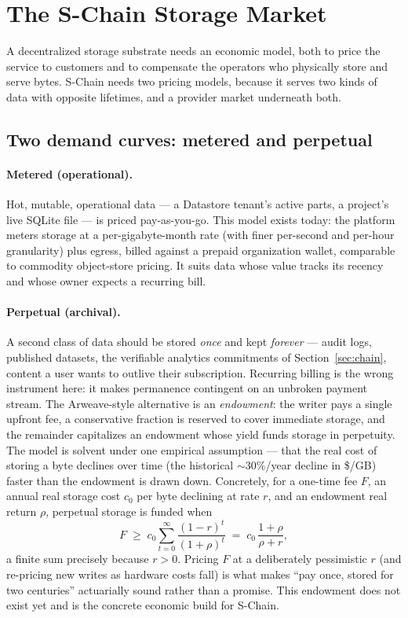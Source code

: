 \section{The S-Chain Storage Market}
\label{sec:economics}

A decentralized storage substrate needs an economic model, both to price the
service to customers and to compensate the operators who physically store and
serve bytes. S-Chain needs two pricing models, because it serves two kinds of
data with opposite lifetimes, and a provider market underneath both.

\subsection{Two demand curves: metered and perpetual}

\paragraph{Metered (operational).} Hot, mutable, operational data --- a
Datastore tenant's active parts, a project's live SQLite file --- is priced
pay-as-you-go. This model exists today: the platform meters storage at a
per-gigabyte-month rate (with finer per-second and per-hour granularity) plus
egress, billed against a prepaid organization wallet, comparable to commodity
object-store pricing. It suits data whose value tracks its recency and whose
owner expects a recurring bill.

\paragraph{Perpetual (archival).} A second class of data should be stored
\emph{once} and kept \emph{forever} --- audit logs, published datasets, the
verifiable analytics commitments of Section~\ref{sec:chain}, content a user
wants to outlive their subscription. Recurring billing is the wrong instrument
here: it makes permanence contingent on an unbroken payment stream. The
Arweave-style alternative is an \emph{endowment}: the writer pays a single
upfront fee, a conservative fraction is reserved to cover immediate storage, and
the remainder capitalizes an endowment whose yield funds storage in perpetuity.
The model is solvent under one empirical assumption --- that the real cost of
storing a byte declines over time (the historical $\sim\!30\%$/year decline in
\$/GB) faster than the endowment is drawn down. Concretely, for a one-time fee
$F$, an annual real storage cost $c_0$ per byte declining at rate $r$, and an
endowment real return $\rho$, perpetual storage is funded when
\[
F \;\ge\; c_0 \sum_{t=0}^{\infty} \frac{(1-r)^t}{(1+\rho)^t}
\;=\; c_0\,\frac{1+\rho}{\rho + r},
\]
a finite sum precisely because $r>0$. Pricing $F$ at a deliberately pessimistic
$r$ (and re-pricing new writes as hardware costs fall) is what makes
``pay once, stored for two centuries'' actuarially sound rather than a promise.
This endowment does not exist yet and is the concrete economic build for S-Chain.

